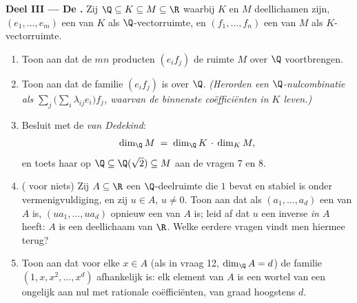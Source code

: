 \begin{problem}
\medskip
\noindent\textbf{Deel III --- De .} Zij $\Q \subseteq K
\subseteq M \subseteq \R$ waarbij $K$ en $M$ deellichamen zijn,
$(e_1, \dots, e_m)$ een  van $K$ als $\Q$-vectorruimte, en
$(f_1, \dots, f_n)$ een  van $M$ als $K$-vectorruimte.
\begin{enumerate}[resume]
  \item Toon aan dat de $mn$ producten $(e_i f_j)$ de ruimte $M$
        over $\Q$ voortbrengen.
  \item Toon aan dat de familie $(e_i f_j)$  is over $\Q$.
        \emph{(Herorden een $\Q$-nulcombinatie als $\sum_j
        \bigl(\sum_i \lambda_{ij} e_i\bigr) f_j$, waarvan de
        binnenste coëfficiënten in $K$ leven.)}
  \item Besluit met de \emph{ van Dedekind}:
        \[
        \dim_\Q M \;=\; \dim_\Q K \,\cdot\, \dim_K M ,
        \]
        en toets haar op $\Q \subseteq \Q(\sqrt2) \subseteq M$ aan
        de vragen 7 en 8.
  \item ( voor niets) Zij $A \subseteq \R$ een
         $\Q$-deelruimte die $1$ bevat en stabiel
        is onder vermenigvuldiging, en zij $u \in A$, $u \neq 0$.
        Toon aan dat als $(a_1, \dots, a_d)$ een  van $A$ is,
        $(u a_1, \dots, u a_d)$ opnieuw een  van $A$ is; leid
        af dat $u$ een inverse \emph{in $A$} heeft: $A$ is een
        deellichaam van $\R$. Welke eerdere vragen vindt men
        hiermee terug?
  \item Toon aan dat voor elke $x \in A$ (als in vraag 12, $\dim_\Q
        A = d$) de familie $(1, x, x^2, \dots, x^{d})$ afhankelijk
        is: elk element van $A$ is een wortel van een 
        ongelijk aan nul met rationale coëfficiënten, van graad
        hoogstens $d$.
\end{enumerate}


\end{problem}
